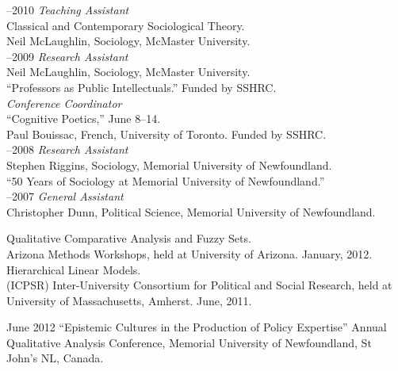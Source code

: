 \documentclass[11pt,usenames,dvipsnames]{article}
\begin{document}
–2010 {\it Teaching Assistant}\\
Classical and Contemporary Sociological Theory.\\
Neil McLaughlin, Sociology, McMaster University.\\

–2009 {\it Research Assistant}\\
Neil McLaughlin, Sociology, McMaster University.\\ 
``Professors as Public Intellectuals.'' Funded by SSHRC.\\

 {\it Conference Coordinator}\\
``Cognitive Poetics,'' June 8–14.\\ 
Paul Bouissac, French, University of Toronto. Funded by SSHRC.\\

–2008 {\it Research Assistant}\\
Stephen Riggins, Sociology, Memorial University of Newfoundland.\\ 
``50 Years of Sociology at Memorial University of Newfoundland.''\\

–2007 {\it General Assistant}\\
Christopher Dunn, Political Science, Memorial University of Newfoundland.\\



\noindent Qualitative Comparative Analysis and Fuzzy Sets.\\ 
Arizona Methods Workshops, held at University of Arizona. January, 2012.\\

\noindent Hierarchical Linear Models.\\ 
(ICPSR) Inter-University Consortium for Political and Social Research, held at University of Massachusetts, Amherst. June, 2011.\\



\ind June 2012 ``Epistemic Cultures in the Production of Policy Expertise'' Annual Qualitative Analysis Conference, Memorial University of Newfoundland, St John's NL, Canada.\\
\end{document}
